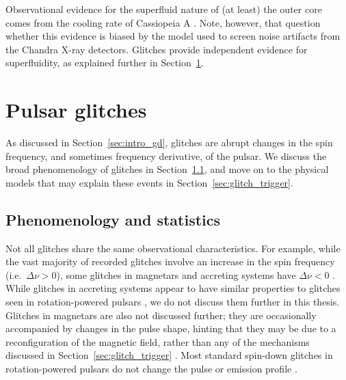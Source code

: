 Observational evidence for the superfluid nature of (at least) the outer core comes from the cooling rate of Cassiopeia A \citep{Heinke2010,Shternin2011,Page2011,Wijngaarden2019}. Note, however, that \citet{Posselt2013,Posselt2018} question whether this evidence is biased by the model used to screen noise artifacts from the Chandra X-ray detectors. Glitches provide independent evidence for superfluidity, as explained further in Section~\ref{sec:intro_glitch}. 

\section{Pulsar glitches} \label{sec:intro_glitch}
As discussed in Section~\ref{sec:intro_gd}, glitches are abrupt changes in the spin frequency, and sometimes frequency derivative, of the pulsar. We discuss the broad phenomenology of glitches in Section~\ref{sec:glitch_phenom}, and move on to the physical models that may explain these events in Section~\ref{sec:glitch_trigger}.

\subsection{Phenomenology and statistics} \label{sec:glitch_phenom}
Not all glitches share the same observational characteristics. For example, while the vast majority of recorded glitches involve an increase in the spin frequency (i.e.~$\Delta \nu > 0$), some glitches in magnetars and accreting systems have $\Delta \nu < 0$ \citep{Ray2019a,Younes2020}. While glitches in accreting systems appear to have similar properties to glitches seen in rotation-powered pulsars \citep{Howitt2022}, we do not discuss them further in this thesis. Glitches in magnetars are also not discussed further; they are occasionally accompanied by changes in the pulse shape, hinting that they may be due to a reconfiguration of the magnetic field, rather than any of the mechanisms discussed in Section~\ref{sec:glitch_trigger} \citep{Dib2008,Dib2014,Garcia2015,Mastrano2015}. Most standard spin-down glitches in rotation-powered pulsars do not change the pulse or emission profile \citep{Espinoza2011,Lyne2012}.

